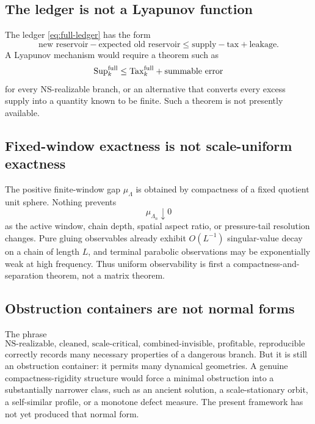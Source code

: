 \documentclass[11pt]{article}
\numberwithin{equation}{section}
\theoremstyle{remark}
\newcommand{\Sup}{\mathrm{Sup}}
\newcommand{\Tax}{\mathrm{Tax}}
\begin{document}
\subsection{The ledger is not a Lyapunov function}

The ledger \eqref{eq:full-ledger} has the form
\[
\text{new reservoir}-\text{expected old reservoir}
\le
\text{supply}-\text{tax}+\text{leakage}.
\]
A Lyapunov mechanism would require a theorem such as
\begin{equation}\label{eq:uniform-taxation}
\Sup_k^{\rm full}
\le
\Tax_k^{\rm full}
+\text{summable error}
\end{equation}
for every NS-realizable branch, or an alternative that converts every excess supply into a quantity known to be finite. Such a theorem is not presently available.

\subsection{Fixed-window exactness is not scale-uniform exactness}

The positive finite-window gap $\mu_\Lambda$ is obtained by compactness of a fixed quotient unit sphere. Nothing prevents
\begin{equation}\label{eq:gap-collapse}
\mu_{\Lambda_n}\downarrow0
\end{equation}
as the active window, chain depth, spatial aspect ratio, or pressure-tail resolution changes. Pure gluing observables already exhibit $O(L^{-1})$ singular-value decay on a chain of length $L$, and terminal parabolic observations may be exponentially weak at high frequency. Thus uniform observability is first a compactness-and-separation theorem, not a matrix theorem.

\subsection{Obstruction containers are not normal forms}

The phrase
\[
\text{NS-realizable, cleaned, scale-critical, combined-invisible, profitable, reproducible cascade}
\]
correctly records many necessary properties of a dangerous branch. But it is still an obstruction container: it permits many dynamical geometries. A genuine compactness-rigidity structure would force a minimal obstruction into a substantially narrower class, such as an ancient solution, a scale-stationary orbit, a self-similar profile, or a monotone defect measure. The present framework has not yet produced that normal form.
\end{document}
